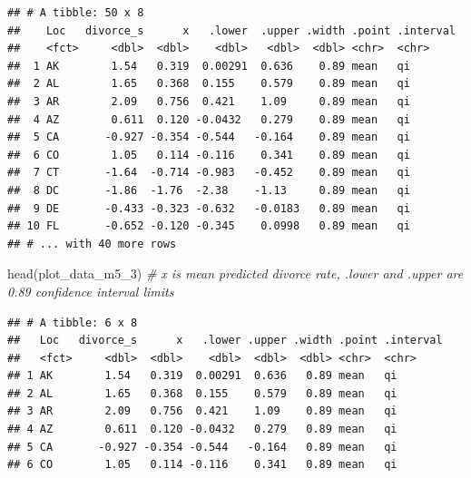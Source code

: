 \documentclass[
]{book}
\newenvironment{Shaded}{\begin{snugshade}}{\end{snugshade}}
\newcommand{\CommentTok}[1]{\textcolor[rgb]{0.56,0.35,0.01}{\textit{#1}}}
\newcommand{\FunctionTok}[1]{\textcolor[rgb]{0.00,0.00,0.00}{#1}}
\newcommand{\NormalTok}[1]{#1}
\begin{document}
\begin{verbatim}
## # A tibble: 50 x 8
##    Loc   divorce_s      x   .lower  .upper .width .point .interval
##    <fct>     <dbl>  <dbl>    <dbl>   <dbl>  <dbl> <chr>  <chr>    
##  1 AK        1.54   0.319  0.00291  0.636    0.89 mean   qi       
##  2 AL        1.65   0.368  0.155    0.579    0.89 mean   qi       
##  3 AR        2.09   0.756  0.421    1.09     0.89 mean   qi       
##  4 AZ        0.611  0.120 -0.0432   0.279    0.89 mean   qi       
##  5 CA       -0.927 -0.354 -0.544   -0.164    0.89 mean   qi       
##  6 CO        1.05   0.114 -0.116    0.341    0.89 mean   qi       
##  7 CT       -1.64  -0.714 -0.983   -0.452    0.89 mean   qi       
##  8 DC       -1.86  -1.76  -2.38    -1.13     0.89 mean   qi       
##  9 DE       -0.433 -0.323 -0.632   -0.0183   0.89 mean   qi       
## 10 FL       -0.652 -0.120 -0.345    0.0998   0.89 mean   qi       
## # ... with 40 more rows
\end{verbatim}

\begin{Shaded}
\begin{Highlighting}[]
\FunctionTok{head}\NormalTok{(plot\_data\_m5\_3) }\CommentTok{\# x is mean predicted divorce rate, .lower and .upper are 0.89 confidence interval limits}
\end{Highlighting}
\end{Shaded}

\begin{verbatim}
## # A tibble: 6 x 8
##   Loc   divorce_s      x   .lower .upper .width .point .interval
##   <fct>     <dbl>  <dbl>    <dbl>  <dbl>  <dbl> <chr>  <chr>    
## 1 AK        1.54   0.319  0.00291  0.636   0.89 mean   qi       
## 2 AL        1.65   0.368  0.155    0.579   0.89 mean   qi       
## 3 AR        2.09   0.756  0.421    1.09    0.89 mean   qi       
## 4 AZ        0.611  0.120 -0.0432   0.279   0.89 mean   qi       
## 5 CA       -0.927 -0.354 -0.544   -0.164   0.89 mean   qi       
## 6 CO        1.05   0.114 -0.116    0.341   0.89 mean   qi
\end{verbatim}
\end{document}
